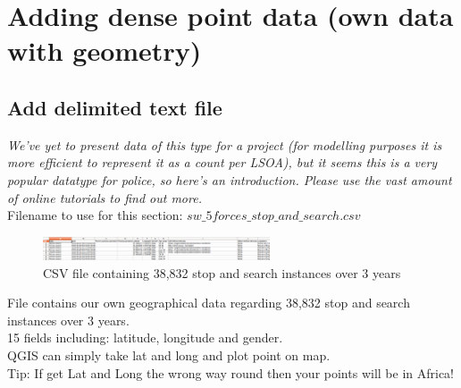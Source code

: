 
\chapter{Adding dense point data (own data with geometry)}

\pagestyle{fancy}
\fancyhf{}
\fancyhead[OC]{\leftmark}
\fancyhead[EC]{\rightmark}
\cfoot{\thepage}


\section{Add delimited text file}

\textit{We've yet to present data of this type for a project (for modelling purposes it is more efficient to represent it as a count per LSOA), but it seems this is a very popular datatype for police, so here's an introduction. Please use the vast amount of online tutorials to find out more.}\\

Filename to use for this section: $sw\_5forces\_stop\_and\_search.csv$\\

\begin{figure}[!h]
	\centering
	\includegraphics[width=0.6\textwidth]{images/image1.png}
	\caption{CSV file containing 38,832 stop and search instances over 3 years}
	\label{ft_fig_firstfig3}
\end{figure}

File contains our own geographical data regarding 38,832 stop and search instances over 3 years.\\
15 fields including: latitude, longitude and gender.\\
QGIS can simply take lat and long and plot point on map.\\
Tip: If get Lat and Long the wrong way round then your points will be in Africa!\\

